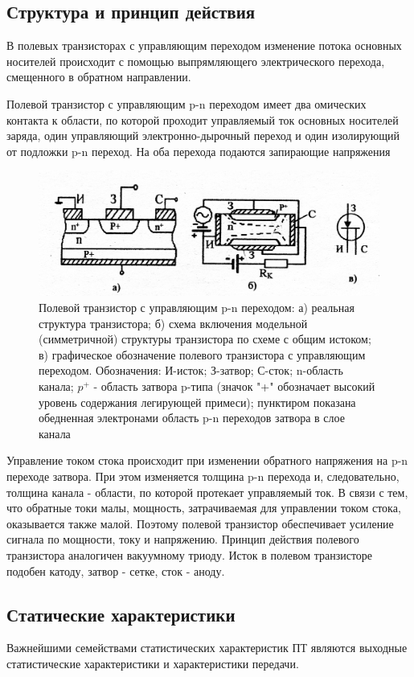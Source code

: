 \subsection{Структура и принцип действия}
В полевых транзисторах с управляющим переходом изменение потока основных носителей происходит с помощью выпрямляющего электрического перехода, смещенного в обратном направлении.

Полевой транзистор с управляющим p-n переходом имеет два омических контакта к области, по которой проходит управляемый ток основных носителей заряда, один управляющий электронно-дырочный переход и один изолирующий от подложки p-n переход. На оба перехода подаются запирающие напряжения
\begin{figure}[h!]
	\centering
	\includegraphics[width=0.5\linewidth]{fig/fig2.jpg}
	\caption{Полевой транзистор с управляющим p-n переходом: а) реальная структура транзистора; б) схема включения модельной (симметричной) структуры транзистора по схеме с общим истоком; в) графическое обозначение полевого транзистора с управляющим переходом. Обозначения: И-исток; З-затвор; С-сток; n-область канала; $p^+$ - область затвора p-типа (значок "+" обозначает высокий уровень содержания легирующей примеси); пунктиром показана обедненная электронами область p-n переходов затвора в слое канала}
	\label{fig:2}
\end{figure}

Управление током стока происходит при изменении обратного напряжения на p-n переходе затвора. При этом изменяется толщина p-n перехода и, следовательно, толщина канала - области, по которой протекает управляемый ток. В связи с тем, что обратные токи малы, мощность, затрачиваемая для управлении током стока, оказывается также малой. Поэтому полевой транзистор обеспечивает усиление сигнала по мощности, току и напряжению. Принцип действия полевого транзистора аналогичен вакуумному триоду. Исток в полевом транзисторе подобен катоду, затвор - сетке, сток - аноду.

\subsection{Статические характеристики}
Важнейшими семействами статистических характеристик ПТ являются выходные статистические характеристики и характеристики передачи.

